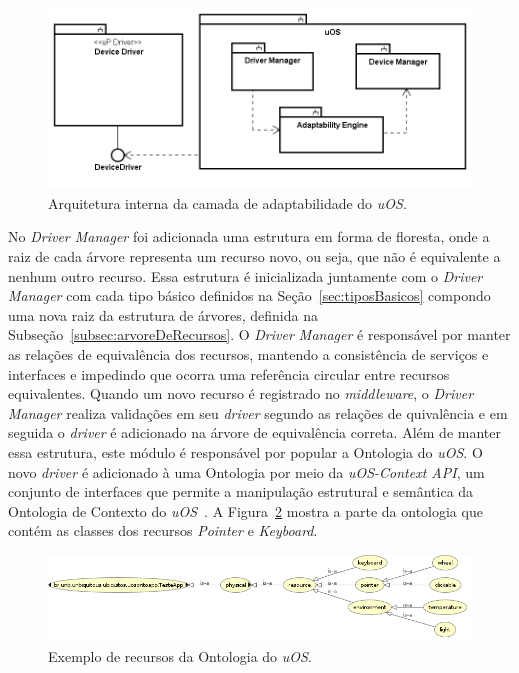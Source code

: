 \begin{figure}[ht]
	\center
	\includegraphics[scale=0.6]{imagens/diagramaDeBlocos}
	\caption{Arquitetura interna da camada de adaptabilidade do \emph{uOS}.}
	\label{fig:diagramaDeBlocos}
\end{figure}

No \emph{Driver Manager} foi adicionada uma estrutura em forma de floresta, onde a raiz de cada árvore representa um recurso novo, ou seja, que não é equivalente a nenhum outro recurso. Essa estrutura é inicializada juntamente com o \emph{Driver Manager} com cada tipo básico definidos na Seção~\ref{sec:tiposBasicos} compondo uma nova raiz da estrutura de árvores, definida na Subseção~\ref{subsec:arvoreDeRecursos}. O \emph{Driver Manager} é responsável por manter as relações de equivalência dos recursos, mantendo a consistência de serviços e interfaces e impedindo que ocorra uma referência circular entre recursos equivalentes. Quando um novo recurso é registrado no \emph{middleware}, o \emph{Driver Manager} realiza validações em seu \emph{driver} segundo as relações de quivalência e em seguida o \emph{driver} é adicionado na árvore de equivalência correta. Além de manter essa estrutura, este módulo é responsável por popular a Ontologia do \emph{uOS}. O novo \emph{driver} é adicionado à uma Ontologia por meio da \emph{uOS-Context API}, um conjunto de interfaces que permite a manipulação estrutural e semântica da Ontologia de Contexto do \emph{uOS}~\cite{ozakisbcup2011}. A Figura~\ref{fig:ontologiaUOS} mostra a parte da ontologia que contém as classes dos recursos \emph{Pointer} e \emph{Keyboard}.

\begin{figure}[ht]
	\center
	\includegraphics[scale=0.55]{imagens/ontologia}
	\caption{Exemplo de recursos da Ontologia do \emph{uOS}.}
	\label{fig:ontologiaUOS}
\end{figure}


